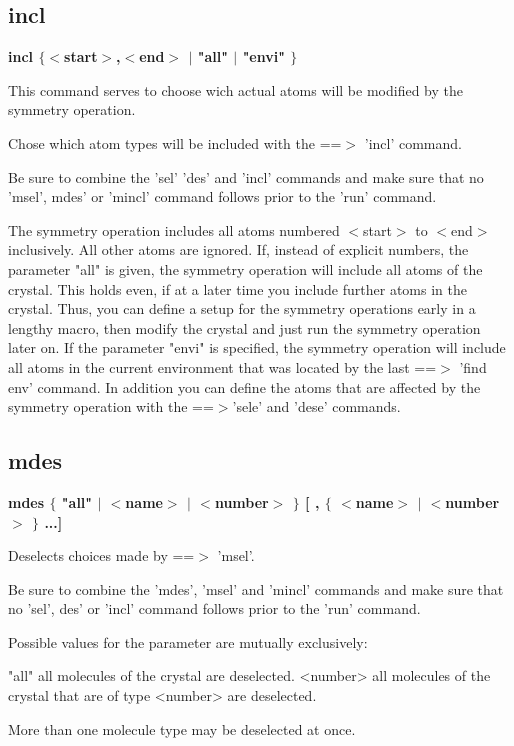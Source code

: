 \subsection*{incl}
{\bf incl $ \{$$ <$start$> $,$ <$end$> $ $| $ "all" $| $ "envi" $\} $ \par }
\par
\vspace{3pt}
This command serves to choose wich actual atoms 
will be modified by the symmetry operation. 
\par
Chose which atom types will be included with the 
==$> $ 'incl' command. 
\par
Be sure to combine the 'sel' 'des' and 'incl' commands and 
make sure that no 'msel', mdes' or 'mincl' command follows 
prior to the 'run' command. 
\par
The symmetry operation includes all atoms numbered $ <$start$> $ to $ <$end$> $ 
inclusively. All other atoms are ignored. 
If, instead of explicit numbers, the parameter "all" is given, the 
symmetry operation will include all atoms of the crystal. This holds 
even, if at a later time you include further atoms in the crystal. 
Thus, you can define a setup for the symmetry operations early in a 
lengthy macro, then modify the crystal and just run the symmetry 
operation later on. 
If the parameter "envi" is specified, the symmetry operation will 
include all atoms in the current environment that was located by the 
last ==$> $ 'find env' command. 
In addition you can define the atoms that are affected by the 
symmetry operation with the ==$> $'sele' and 'dese' commands. 
\subsection*{mdes}
{\bf mdes $ \{$ "all" $| $ $ <$name$> $ $| $ $ <$number$> $ $\} $ [ , $ \{$ $ <$name$> $ $| $ $ <$number$> $ $\} $ ...] \par }
\par
\vspace{3pt}
Deselects choices made by ==$> $ 'msel'. 
\par
Be sure to combine the 'mdes', 'msel' and 'mincl' commands and 
make sure that no 'sel', des' or 'incl' command follows 
prior to the 'run' command. 
\par
Possible values for the parameter are mutually exclusively: 
\par
\begin{MacVerbatim}
"all"     all molecules of the crystal are deselected.
<number>  all molecules of the crystal that are of type <number>
          are deselected.
\end{MacVerbatim}
More than one molecule type may be deselected at once. 
